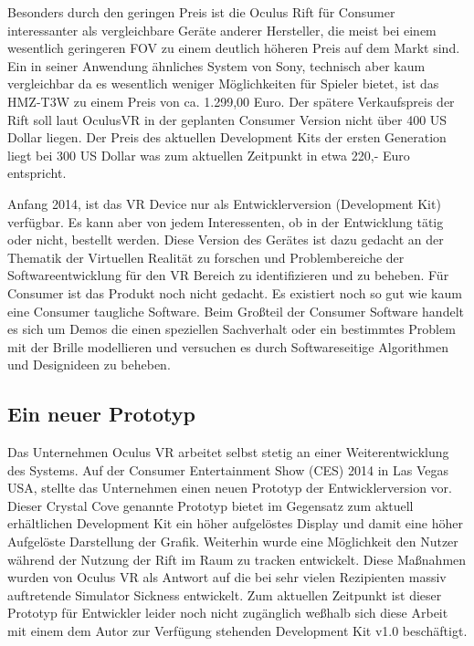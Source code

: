 \documentclass[pagesize, paper=a4, fontsize=12pt,titlepage=true, headings=small, headnosepline, abstractoff, liststotoc, nochapterprefix, plainheadsepline]{scrreprt}
\begin{document}
Besonders durch den geringen Preis ist die Oculus Rift für Consumer interessanter als vergleichbare Geräte anderer Hersteller, die meist bei einem wesentlich geringeren FOV zu einem deutlich höheren Preis auf dem Markt sind. Ein in seiner Anwendung ähnliches System von Sony, technisch aber kaum vergleichbar da es wesentlich weniger Möglichkeiten für Spieler bietet, ist das HMZ-T3W zu einem Preis von ca. 1.299,00 Euro. Der spätere Verkaufspreis der Rift soll laut OculusVR in der geplanten Consumer Version nicht über 400 US Dollar liegen. Der Preis des aktuellen Development Kits der ersten Generation liegt bei 300 US Dollar was zum aktuellen Zeitpunkt in etwa 220,- Euro entspricht.

Anfang 2014, ist das VR Device nur als Entwicklerversion (Development Kit) verfügbar. Es kann aber von jedem Interessenten, ob in der Entwicklung tätig oder nicht, bestellt werden. Diese Version des Gerätes ist dazu gedacht an der Thematik der Virtuellen Realität zu forschen und Problembereiche der Softwareentwicklung für den VR Bereich zu identifizieren und zu beheben. Für Consumer ist das Produkt noch nicht gedacht. Es existiert noch so gut wie kaum eine Consumer taugliche Software. Beim Großteil der Consumer Software handelt es sich um Demos die einen speziellen Sachverhalt oder ein bestimmtes Problem mit der Brille modellieren und versuchen es durch Softwareseitige Algorithmen und Designideen zu beheben.

\subsection{Ein neuer Prototyp}
Das Unternehmen Oculus VR arbeitet selbst stetig an einer Weiterentwicklung des Systems. Auf der Consumer Entertainment Show (CES) 2014 in Las Vegas USA, stellte das Unternehmen einen neuen Prototyp der Entwicklerversion vor. Dieser Crystal Cove genannte Prototyp bietet im Gegensatz zum aktuell erhältlichen Development Kit ein höher aufgelöstes Display und damit eine höher Aufgelöste Darstellung der Grafik. Weiterhin wurde eine Möglichkeit den Nutzer während der Nutzung der Rift im Raum zu tracken entwickelt. Diese Maßnahmen wurden von Oculus VR als Antwort auf die bei sehr vielen Rezipienten massiv auftretende Simulator Sickness entwickelt. Zum aktuellen Zeitpunkt ist dieser Prototyp für Entwickler leider noch nicht zugänglich weßhalb sich diese Arbeit mit einem dem Autor zur Verfügung stehenden Development Kit v1.0 beschäftigt.
\end{document}
